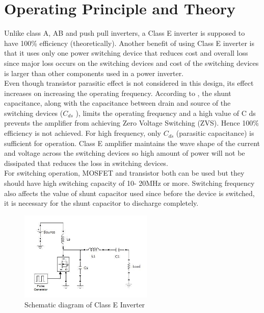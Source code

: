 \documentclass[journal,twoside]{IEEEtran}
\begin{document}
\section{Operating Principle and Theory}
Unlike class A, AB and push pull inverters, a Class E inverter
is supposed to have 100\% efficiency (theoretically). Another
benefit of using Class E inverter is that it uses only one power
switching device that reduces cost and overall loss since
major loss occurs on the switching devices and cost of the
switching devices is larger than other components used in a
power inverter.\\

Even though transistor parasitic effect is not considered in this
design, its effect increases on increasing the operating
frequency. According to \cite{Sokal2001}, the shunt capacitance, along with
the capacitance between drain and source of the switching
devices ($C_{ds}$ ), limits the operating frequency and a high value
of C ds prevents the amplifier from achieving Zero Voltage
Switching (ZVS). Hence 100\% efficiency is not achieved. For
high frequency, only $C_{ds}$ (parasitic capacitance) is sufficient
for operation. Class E amplifier maintains the wave shape of
the current and voltage across the switching devices so high
amount of power will not be dissipated that reduces the loss in
switching devices.\\
For switching operation, MOSFET and transistor both can be
used but they should have high switching capacity of 10-
20MHz or more. Switching frequency also affects the value
of shunt capacitor used since before the device is switched, it
is necessary for the shunt capacitor to discharge completely.\\

\begin{figure}[!ht]
\centering
\includegraphics[width=2.5in]{1}
\caption{Schematic diagram of Class E Inverter}
\label{fig_1}
\end{figure}
\end{document}
